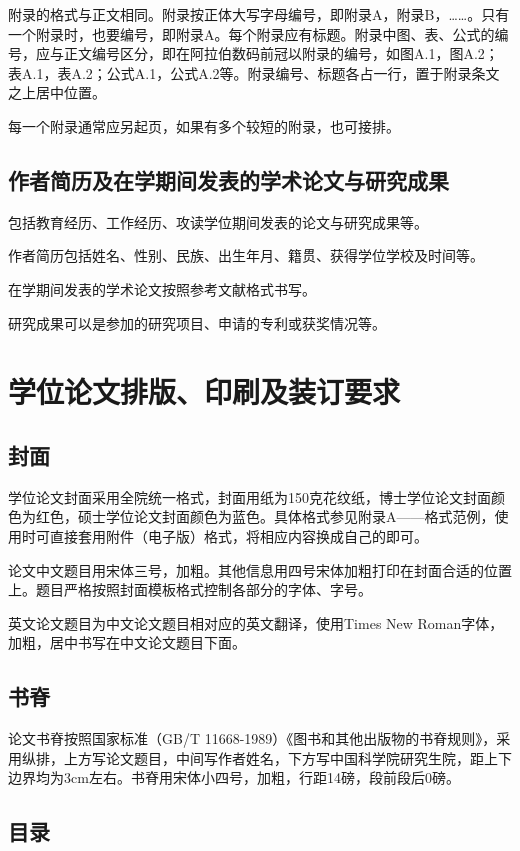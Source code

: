\documentclass[a4paper,12pt,oneside,openany]{book}
\begin{document}
\begin{CJK}{UTF8}{hei}
附录的格式与正文相同。附录按正体大写字母编号，即附录A，附录B，……。只有一个附录时，也要编号，即附录A。每个附录应有标题。附录中图、表、公式的编号，应与正文编号区分，即在阿拉伯数码前冠以附录的编号，如图A.1，图A.2；表A.1，表A.2；公式A.1，公式A.2等。附录编号、标题各占一行，置于附录条文之上居中位置。

每一个附录通常应另起页，如果有多个较短的附录，也可接排。 


\subsection{作者简历及在学期间发表的学术论文与研究成果}

包括教育经历、工作经历、攻读学位期间发表的论文与研究成果等。

作者简历包括姓名、性别、民族、出生年月、籍贯、获得学位学校及时间等。

在学期间发表的学术论文按照参考文献格式书写。

研究成果可以是参加的研究项目、申请的专利或获奖情况等。 


\section{学位论文排版、印刷及装订要求}


\subsection{封面}

学位论文封面采用全院统一格式，封面用纸为150克花纹纸，博士学位论文封面颜色为红色，硕士学位论文封面颜色为蓝色。具体格式参见附录A——格式范例，使用时可直接套用附件（电子版）格式，将相应内容换成自己的即可。

论文中文题目用宋体三号，加粗。其他信息用四号宋体加粗打印在封面合适的位置上。题目严格按照封面模板格式控制各部分的字体、字号。

英文论文题目为中文论文题目相对应的英文翻译，使用Times New Roman字体，加粗，居中书写在中文论文题目下面。 


\subsection{书脊}

论文书脊按照国家标准（GB/T 11668-1989）《图书和其他出版物的书脊规则》，采用纵排，上方写论文题目，中间写作者姓名，下方写中国科学院研究生院，距上下边界均为3cm左右。书脊用宋体小四号，加粗，行距14磅，段前段后0磅。


\subsection{目录}


\end{CJK}
\end{document}
